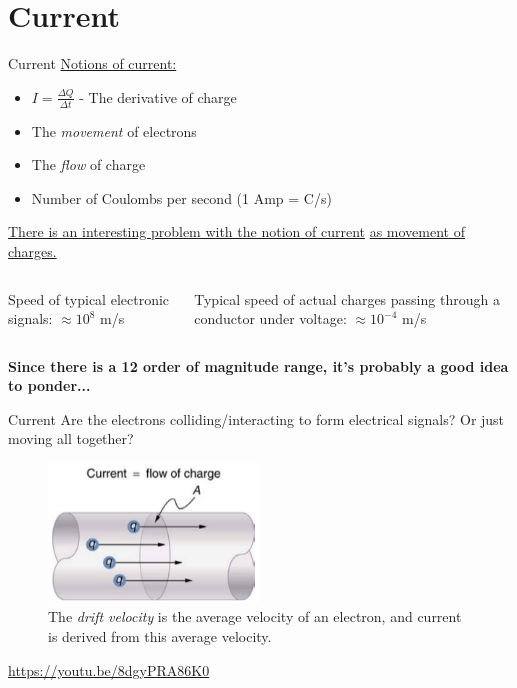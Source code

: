 \documentclass{beamer}
\begin{document}
\section{Current}

\begin{frame}{Current}
\underline{Notions of current:}
\begin{itemize}
	\item $I = \frac{\Delta Q}{\Delta t}$ - The derivative of charge
	\item The \textit{movement} of electrons
	\item The \textit{flow} of charge
	\item Number of Coulombs per second (1 Amp = C/s)
\end{itemize}
\underline{There is an interesting problem with the notion of current} \underline{as movement of charges.} \\ \vspace{0.5cm}
\begin{columns}[T]
\begin{column}{0.5\textwidth}
Speed of typical electronic signals: $\approx 10^{8}$ m/s
\end{column}
\begin{column}{0.5\textwidth}
Typical speed of actual charges passing through a conductor under voltage: $\approx 10^{-4}$ m/s
\end{column}
\end{columns} \vspace{0.25cm}
\textbf{Since there is a 12 order of magnitude range, it's probably a good idea to ponder...}
\end{frame}

\begin{frame}{Current}
\small
Are the electrons colliding/interacting to form electrical signals?  Or just moving all together?
\begin{figure}
\includegraphics[width=0.5\textwidth]{figures/current1.png}
\caption{\label{fig:current1} The \textit{drift velocity} is the average velocity of an electron, and current is derived from this average velocity.}
\end{figure}
\url{https://youtu.be/8dgyPRA86K0}
\end{frame}
\end{document}
